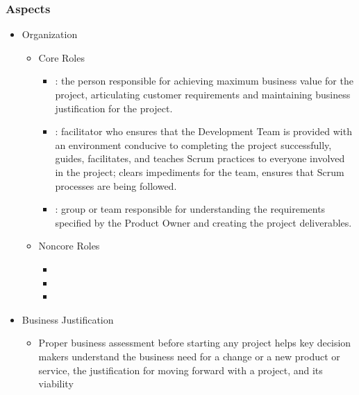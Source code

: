 \documentclass[letterpaper,10pt,english]{jupyterBook}
\begin{document}
\subsubsection{Aspects}
\label{\detokenize{APM/sbok:aspects}}\begin{itemize}
\item {} 
\sphinxAtStartPar
Organization
\begin{itemize}
\item {} 
\sphinxAtStartPar
Core Roles
\begin{itemize}
\item {} 
\sphinxAtStartPar
{}: the person responsible for achieving maximum business value for the project, articulating customer requirements and maintaining business justification for the project.

\item {} 
\sphinxAtStartPar
{}: facilitator who ensures that the Development Team is provided with an environment conducive to completing the project successfully, guides, facilitates, and teaches Scrum practices to everyone involved in the project; clears impediments for the team, ensures that Scrum processes are being followed.

\item {} 
\sphinxAtStartPar
{}: group or team responsible for understanding the requirements specified by the Product Owner and creating the project deliverables.

\end{itemize}

\item {} 
\sphinxAtStartPar
Non\sphinxhyphen{}core Roles
\begin{itemize}
\item {} 
\sphinxAtStartPar
{}

\item {} 
\sphinxAtStartPar
{}

\item {} 
\sphinxAtStartPar
{}

\end{itemize}

\end{itemize}

\item {} 
\sphinxAtStartPar
Business Justification
\begin{itemize}
\item {} 
\sphinxAtStartPar
Proper business assessment before starting any project helps key decision makers understand the business need for a change or a new product or service, the justification for moving forward with a project, and its viability


\end{itemize}
\end{itemize}
\end{document}
